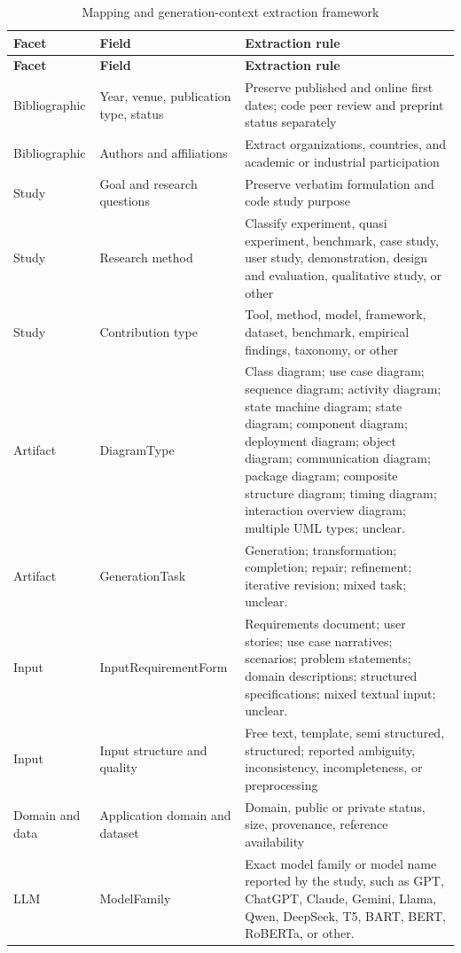 \begin{longtable}{p{} p{} p{}}
\caption{Mapping and generation-context extraction framework}
\label{tab:protocol_mapping_extraction}\\
\toprule
\textbf{Facet} & \textbf{Field} & \textbf{Extraction rule} \\
\midrule
\endfirsthead
\toprule
\textbf{Facet} & \textbf{Field} & \textbf{Extraction rule} \\
\midrule
\endhead
Bibliographic & Year, venue, publication type, status & Preserve published and online first dates; code peer review and preprint status separately \\
Bibliographic & Authors and affiliations & Extract organizations, countries, and academic or industrial participation \\
Study & Goal and research questions & Preserve verbatim formulation and code study purpose \\
Study & Research method & Classify experiment, quasi experiment, benchmark, case study, user study, demonstration, design and evaluation, qualitative study, or other \\
Study & Contribution type & Tool, method, model, framework, dataset, benchmark, empirical findings, taxonomy, or other \\
Artifact & DiagramType & Class diagram; use case diagram; sequence diagram; activity diagram; state machine diagram; state diagram; component diagram; deployment diagram; object diagram; communication diagram; package diagram; composite structure diagram; timing diagram; interaction overview diagram; multiple UML types; unclear. \\
Artifact & GenerationTask & Generation; transformation; completion; repair; refinement; iterative revision; mixed task; unclear. \\
Input & InputRequirementForm & Requirements document; user stories; use case narratives; scenarios; problem statements; domain descriptions; structured specifications; mixed textual input; unclear. \\
Input & Input structure and quality & Free text, template, semi structured, structured; reported ambiguity, inconsistency, incompleteness, or preprocessing \\
Domain and data & Application domain and dataset & Domain, public or private status, size, provenance, reference availability \\
LLM & ModelFamily & Exact model family or model name reported by the study, such as GPT, ChatGPT, Claude, Gemini, Llama, Qwen, DeepSeek, T5, BART, BERT, RoBERTa, or other. \\

\end{longtable}
